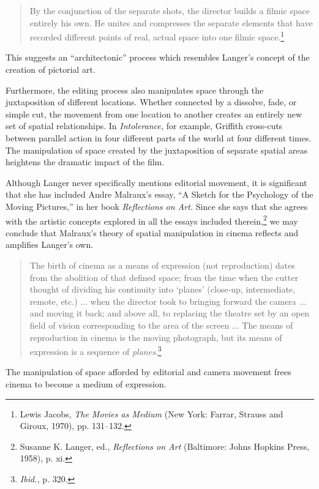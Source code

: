 \documentclass{tufte-handout}
\begin{document}
\begin{quote}
By the conjunction of the separate shots, the director builds a filmic
space entirely his own. He unites and compresses the separate elements
that have recorded different points of real, actual space into one
filmic space.\footnote{Lewis Jacobs, \emph{The Movies as Medium} (New
  York: Farrar, Strauss and Giroux, 1970), pp. 131--132.}
\end{quote}

\noindent This suggests an ``architectonic'' process which resembles Langer's
concept of the creation of pictorial art.

Furthermore, the editing process also manipulates space through the
juxtaposition of different locations. Whether connected by a dissolve,
fade, or simple cut, the movement from one location to another creates
an en­tirely new set of spatial relationships. In \emph{Intolerance,} for
example, Griffith cross-cuts between parallel action in four different
parts of the world at four different times. The manipulation of space
created by the juxtaposi­tion of separate spatial areas heightens the
dramatic impact of the film.

Although Langer never specifically mentions editorial movement, it is
significant that she has included Andre Malraux's essay, ``A Sketch for
the Psychology of the Moving Pictures,'' in her book \emph{Reflections
on Art.} Since she says that she agrees with the artistic concepts
explored in all the essays included therein,\footnote{Susanne K. Langer,
  ed., \emph{Reflections on Art} (Baltimore: Johns Hopkins Press, 1958),
  p. xi.} we may conclude that Malraux's theory of spatial ma­nipulation
in cinema reflects and amplifies Langer's own.

\begin{quote}
The birth of cinema as a means of expression (not reproduction) dates
from the abolition of that defined space; from the time when the cutter
thought of dividing his continuity into `planes' (close-up,
intermediate, remote, etc.) ... when the director took to bringing
forward the camera ... and moving it back; and above all, to replacing
the theatre set by an open field of vision corresponding to the area of
the screen ... The means of reproduction in cinema is the moving
photograph, but its means of expression is a sequence of
\emph{planes}.\footnote{\emph{Ibid.,} p. 320.}
\end{quote}

\noindent The manipulation of space afforded by editorial and camera movement
frees cinema to become a medium of expression.
\end{document}
